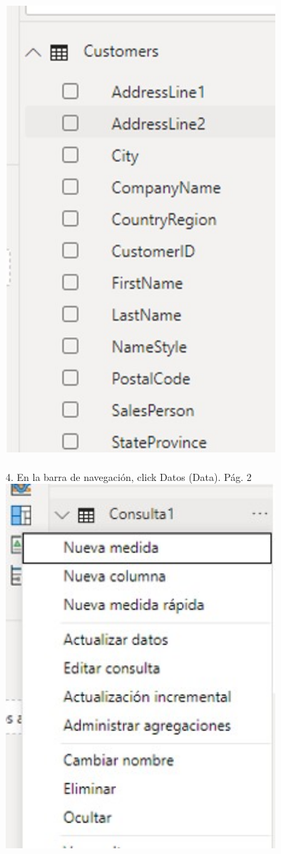 \documentclass[preprint,12pt]{elsarticle}
\begin{document}
\begin{itemize}
		 		\\ \includegraphics[width=10cm]{./IMAGENES/2.3} \\
		 		\\ 4. En la barra de navegación, click Datos (Data).
		 		Pág. 2
		 		\\ \includegraphics[width=10cm]{./IMAGENES/2.1} \\

\end{itemize}
\end{document}

